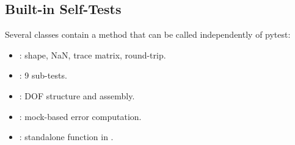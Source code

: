 \subsection{Built-in Self-Tests}

Several classes contain a  method that can be called
independently of pytest:

\begin{itemize}
  \item {}: shape, NaN, trace matrix, round-trip.
  \item {}: 9 sub-tests.
  \item {}: DOF structure and assembly.
  \item {}: mock-based error computation.
  \item {}: standalone function in .
\end{itemize}

